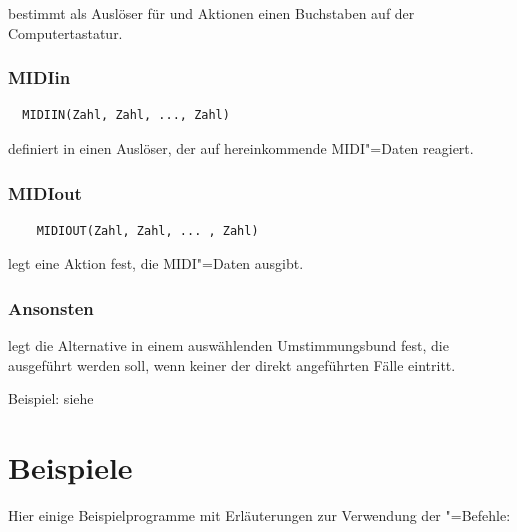 { bestimmt als Auslöser für
 und Aktionen einen Buchstaben auf der
Computertastatur.

\subsection{MIDIin}
\label{sec:SX_MIDIIN}



\begin{verbatim}
  MIDIIN(Zahl, Zahl, ..., Zahl)
\end{verbatim}





 definiert in  einen Auslöser, der 
auf hereinkommende MIDI"=Daten reagiert.

\subsection{MIDIout}
\label{sec:SX_MIDIOUT}



\begin{verbatim}
    MIDIOUT(Zahl, Zahl, ... , Zahl)
\end{verbatim}

 legt eine Aktion fest, die MIDI"=Daten ausgibt.


\subsection{Ansonsten}
\label{sec:SX_ELSE}



 legt die Alternative in einem auswählenden Umstimmungsbund 
fest, die ausgeführt werden soll, wenn keiner der direkt angeführten 
Fälle eintritt.


Beispiel: siehe 


\chapter{Beispiele}
\label{sec:SX_EXAMPLES}
Hier einige Beispielprogramme mit Erläuterungen zur Verwendung 
der \mutabor{}"=Befehle:


}

